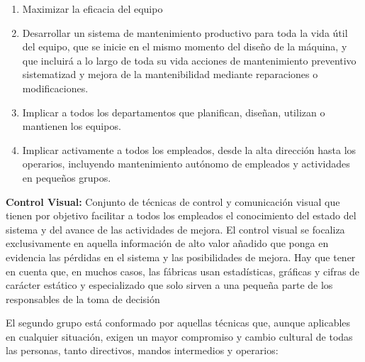 \begin{description}
\begin{enumerate}
\item Maximizar la eficacia del equipo
\item Desarrollar un sistema de mantenimiento productivo para toda la vida útil del equipo, que se inicie en el mismo momento del diseño de la máquina, y que incluirá a lo largo de toda su vida acciones de mantenimiento preventivo sistematizad y mejora de la mantenibilidad mediante reparaciones o modificaciones.
\item Implicar a todos los departamentos que planifican, diseñan, utilizan o mantienen los equipos.
\item Implicar activamente a todos los empleados, desde la alta dirección hasta los operarios, incluyendo mantenimiento autónomo de empleados y actividades en pequeños grupos.
\end{enumerate}

\item \textbf{Control Visual:} Conjunto de técnicas de control y comunicación visual que tienen por objetivo facilitar a todos los empleados el conocimiento del estado del sistema y del avance de las actividades de mejora. El control visual se focaliza exclusivamente en aquella información de alto valor añadido que ponga en evidencia las pérdidas en el sistema y las posibilidades de mejora. Hay que tener en cuenta que, en muchos casos, las fábricas usan estadísticas, gráficas y cifras de carácter estático y especializado que solo sirven a una pequeña parte de los responsables de la toma de decisión

\end{description}

El segundo grupo está conformado por aquellas técnicas que, aunque aplicables en cualquier situación, exigen un mayor compromiso y cambio cultural de todas las personas, tanto directivos, mandos intermedios y operarios:


